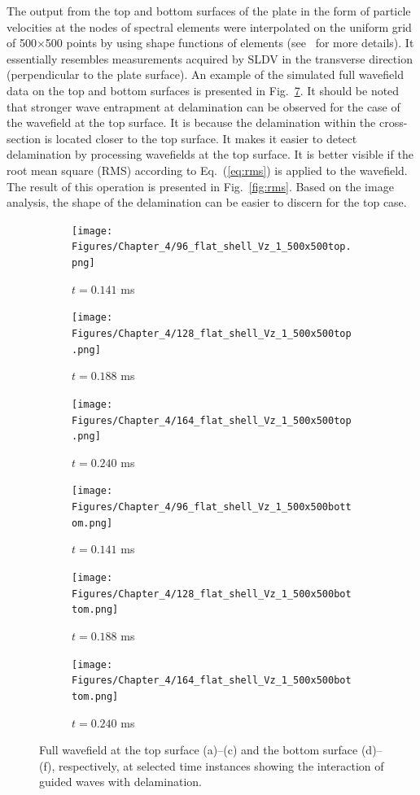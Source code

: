 The output from the top and bottom surfaces of the plate in the form of particle velocities at the nodes of spectral elements were interpolated on the uniform grid of 500\(\times\)500 points by using shape functions of elements (see~\cite{Kudela2020} for more details).
It essentially resembles measurements acquired by SLDV in the transverse direction (perpendicular to the plate surface).
An example of the simulated full wavefield data on the top and bottom surfaces is presented in Fig.~\ref{fig:wavefield}.
It should be noted that stronger wave entrapment at delamination can be observed for the case of the wavefield at the top surface.
It is because the delamination within the cross-section is located closer to the top surface.
It makes it easier to detect delamination by processing wavefields at the top surface.
It is better visible if the root mean square (RMS) according to Eq.~(\ref{eq:rms}) is applied to the wavefield.
The result of this operation is presented in Fig.~\ref{fig:rms}.
Based on the image analysis, the shape of the delamination can be easier to discern for the top case.
\begin{figure} [h!]
	\centering
	\begin{subfigure}[b]{0.32\textwidth}
		\centering
		\texttt{[image: Figures/Chapter\_4/96\_flat\_shell\_Vz\_1\_500x500top.png]}
		\caption{\(t=0.141\) ms}
		\label{fig:frame96top}
	\end{subfigure}
	\hfill
	\begin{subfigure}[b]{0.32\textwidth}
		\centering
		\texttt{[image: Figures/Chapter\_4/128\_flat\_shell\_Vz\_1\_500x500top.png]}
		\caption{\(t=0.188\) ms}
		\label{fig:frame128top}
	\end{subfigure}
	\hfill
	\begin{subfigure}[b]{0.32\textwidth}
		\centering
		\texttt{[image: Figures/Chapter\_4/164\_flat\_shell\_Vz\_1\_500x500top.png]}
		\caption{\(t=0.240\) ms}
		\label{fig:frame164top}
	\end{subfigure}	
	\hfill
	\begin{subfigure}[b]{0.32\textwidth}
		\centering
		\texttt{[image: Figures/Chapter\_4/96\_flat\_shell\_Vz\_1\_500x500bottom.png]}
		\caption{\(t=0.141\) ms}
		\label{fig:frame96bottom}
	\end{subfigure}
	\hfill
	\begin{subfigure}[b]{0.32\textwidth}
		\centering
		\texttt{[image: Figures/Chapter\_4/128\_flat\_shell\_Vz\_1\_500x500bottom.png]}
		\caption{\(t=0.188\) ms}
		\label{fig:frame128bottom}
	\end{subfigure}
	\hfill
	\begin{subfigure}[b]{0.32\textwidth}
		\centering
		\texttt{[image: Figures/Chapter\_4/164\_flat\_shell\_Vz\_1\_500x500bottom.png]}
		\caption{\(t=0.240\) ms}
		\label{fig:frame164bottom}
	\end{subfigure}
	
	\caption{Full wavefield at the top surface (a)--(c) and the bottom surface (d)--(f), respectively, at selected time instances showing the interaction of guided waves with delamination.}
	\label{fig:wavefield}
\end{figure} 

